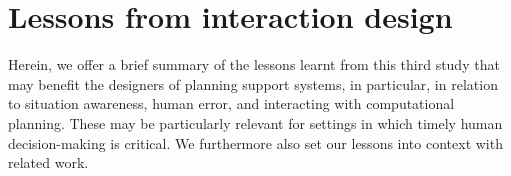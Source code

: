 






\section{Lessons from interaction design} 
Herein, we offer a brief summary of the lessons learnt from this third study that may benefit the designers of planning support systems, in particular, in relation to situation awareness, human error, and interacting with computational planning. These may be particularly relevant for settings in which timely human decision-making is critical. We furthermore also set our lessons into context with related work.


